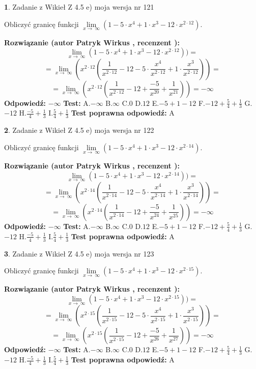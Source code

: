\documentclass[12pt, a4paper]{article}
\theoremstyle{definition} %
\newtheorem{zad}{}
\newcommand{\zadStart}[1]{\begin{zad}#1\newline}
\newcommand{\zadStop}{\end{zad}}
\newcommand{\rozwStart}[2]{\noindent \textbf{Rozwiązanie (autor #1 , recenzent #2): }\newline}
\newcommand{\rozwStop}{\newline}
\newcommand{\odpStart}{\noindent \textbf{Odpowiedź:}\newline}
\newcommand{\odpStop}{\newline}
\newcommand{\testStart}{\noindent \textbf{Test:}\newline}
\newcommand{\testStop}{\newline}
\newcommand{\kluczStart}{\noindent \textbf{Test poprawna odpowiedź:}\newline}
\newcommand{\kluczStop}{\newline}
\begin{document}
\zadStart{Zadanie z Wikieł Z 4.5 e) moja wersja nr 121}



Obliczyć granicę funkcji  $\lim\limits_{x\to\ \infty}(1 - 5 \cdot x^{4}+1 \cdot x^{3}- 12 \cdot x^{2\cdot12})$.
\zadStop
\rozwStart{Patryk Wirkus}{}
$$\lim\limits_{x\to\ \infty}(1 - 5 \cdot x^{4}+1 \cdot x^{3}- 12 \cdot x^{2\cdot12}))=$$
$$=\lim\limits_{x\to\ \infty}(x^{2\cdot12}(\frac{1}{x^{2\cdot12}}-12 -5 \cdot \frac{x^{4}}{x^{2\cdot12}}+1 \cdot \frac{x^{3}}{x^{2\cdot12}}))=$$
$$=\lim\limits_{x\to\ \infty}(x^{2\cdot12}(\frac{1}{x^{2\cdot12}}-12 + \frac{-5}{x^{20}}+ \frac{1}{x^{21}}))=-\infty$$
\rozwStop
\odpStart
$-\infty$
\odpStop
\testStart
A.$-\infty$ B.$\infty$ C.$0$ D.$12$ E.$-5 + 1 - 12$
F.$-12+\frac{5}{4}+\frac{1}{3}$ G.$-12$
H.$\frac{-5}{4}+\frac{1}{3}$
I.$\frac{5}{4}+\frac{1}{3}$
\testStop
\kluczStart
A
\kluczStop



\zadStart{Zadanie z Wikieł Z 4.5 e) moja wersja nr 122}



Obliczyć granicę funkcji  $\lim\limits_{x\to\ \infty}(1 - 5 \cdot x^{4}+1 \cdot x^{3}- 12 \cdot x^{2\cdot14})$.
\zadStop
\rozwStart{Patryk Wirkus}{}
$$\lim\limits_{x\to\ \infty}(1 - 5 \cdot x^{4}+1 \cdot x^{3}- 12 \cdot x^{2\cdot14}))=$$
$$=\lim\limits_{x\to\ \infty}(x^{2\cdot14}(\frac{1}{x^{2\cdot14}}-12 -5 \cdot \frac{x^{4}}{x^{2\cdot14}}+1 \cdot \frac{x^{3}}{x^{2\cdot14}}))=$$
$$=\lim\limits_{x\to\ \infty}(x^{2\cdot14}(\frac{1}{x^{2\cdot14}}-12 + \frac{-5}{x^{24}}+ \frac{1}{x^{25}}))=-\infty$$
\rozwStop
\odpStart
$-\infty$
\odpStop
\testStart
A.$-\infty$ B.$\infty$ C.$0$ D.$12$ E.$-5 + 1 - 12$
F.$-12+\frac{5}{4}+\frac{1}{3}$ G.$-12$
H.$\frac{-5}{4}+\frac{1}{3}$
I.$\frac{5}{4}+\frac{1}{3}$
\testStop
\kluczStart
A
\kluczStop



\zadStart{Zadanie z Wikieł Z 4.5 e) moja wersja nr 123}



Obliczyć granicę funkcji  $\lim\limits_{x\to\ \infty}(1 - 5 \cdot x^{4}+1 \cdot x^{3}- 12 \cdot x^{2\cdot15})$.
\zadStop
\rozwStart{Patryk Wirkus}{}
$$\lim\limits_{x\to\ \infty}(1 - 5 \cdot x^{4}+1 \cdot x^{3}- 12 \cdot x^{2\cdot15}))=$$
$$=\lim\limits_{x\to\ \infty}(x^{2\cdot15}(\frac{1}{x^{2\cdot15}}-12 -5 \cdot \frac{x^{4}}{x^{2\cdot15}}+1 \cdot \frac{x^{3}}{x^{2\cdot15}}))=$$
$$=\lim\limits_{x\to\ \infty}(x^{2\cdot15}(\frac{1}{x^{2\cdot15}}-12 + \frac{-5}{x^{26}}+ \frac{1}{x^{27}}))=-\infty$$
\rozwStop
\odpStart
$-\infty$
\odpStop
\testStart
A.$-\infty$ B.$\infty$ C.$0$ D.$12$ E.$-5 + 1 - 12$
F.$-12+\frac{5}{4}+\frac{1}{3}$ G.$-12$
H.$\frac{-5}{4}+\frac{1}{3}$
I.$\frac{5}{4}+\frac{1}{3}$
\testStop
\kluczStart
A
\kluczStop
\end{document}
